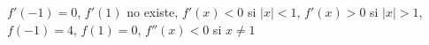\item $f'(-1) = 0$, $f'(1)$ no existe, $f'(x) < 0$ si $|x| < 1$, $f'(x) > 0$ si $|x| > 1$, $f(-1) = 4$, $f(1) = 0$, $f''(x) < 0$ si $x \ne 1$
